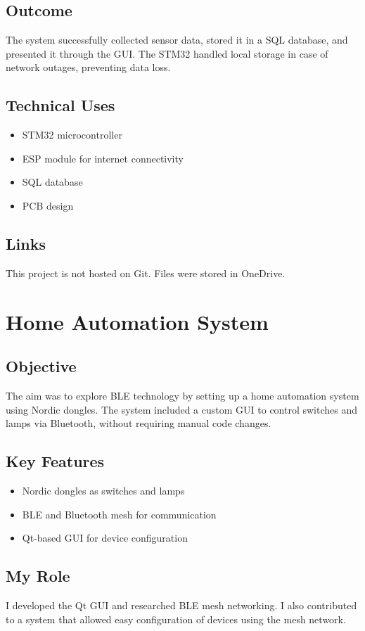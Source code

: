\documentclass{article}
\begin{document}
\subsection{Outcome}
The system successfully collected sensor data, stored it in a SQL database, and presented it through the GUI. The STM32 handled local storage in case of network outages, preventing data loss.

\subsection{Technical Uses}
\begin{itemize}
    \item STM32 microcontroller
    \item ESP module for internet connectivity
    \item SQL database
    \item PCB design
\end{itemize}

\subsection{Links}
This project is not hosted on Git. Files were stored in OneDrive.

\section{Home Automation System}
\subsection{Objective}
The aim was to explore BLE technology by setting up a home automation system using Nordic dongles. The system included a custom GUI to control switches and lamps via Bluetooth, without requiring manual code changes.

\subsection{Key Features}
\begin{itemize}
    \item Nordic dongles as switches and lamps
    \item BLE and Bluetooth mesh for communication
    \item Qt-based GUI for device configuration
\end{itemize}

\subsection{My Role}
I developed the Qt GUI and researched BLE mesh networking. I also contributed to a system that allowed easy configuration of devices using the mesh network.
\end{document}
